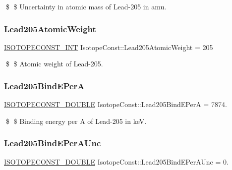 \$ \$ Uncertainty in atomic mass of Lead-\/205 in amu. \mbox{\label{group___isotope_const-_lead-_pb205_ga98f1d4f54ef198f49d8a35fec84fb336}} 
\subsubsection{\texorpdfstring{Lead205\+Atomic\+Weight}{Lead205AtomicWeight}}
{\footnotesize\ttfamily \mbox{\hyperlink{group___isotope_const-_macros_ga5f18360b3e99483a35c32d789e62621c}{I\+S\+O\+T\+O\+P\+E\+C\+O\+N\+S\+T\+\_\+\+I\+NT}} Isotope\+Const\+::\+Lead205\+Atomic\+Weight = 205}

\$ \$ Atomic weight of Lead-\/205. \mbox{\label{group___isotope_const-_lead-_pb205_ga2eb5e7edfab388ef4a3b675b405cca5b}} 
\subsubsection{\texorpdfstring{Lead205\+Bind\+E\+PerA}{Lead205BindEPerA}}
{\footnotesize\ttfamily \mbox{\hyperlink{group___isotope_const-_macros_ga8f45a7272ce02c0b4c65c44636ed719a}{I\+S\+O\+T\+O\+P\+E\+C\+O\+N\+S\+T\+\_\+\+D\+O\+U\+B\+LE}} Isotope\+Const\+::\+Lead205\+Bind\+E\+PerA = 7874.}

\$ \$ Binding energy per A of Lead-\/205 in keV. \mbox{\label{group___isotope_const-_lead-_pb205_ga0b8cdb74cdd2b3d8f9e1835adcd42325}} 
\subsubsection{\texorpdfstring{Lead205\+Bind\+E\+Per\+A\+Unc}{Lead205BindEPerAUnc}}
{\footnotesize\ttfamily \mbox{\hyperlink{group___isotope_const-_macros_ga8f45a7272ce02c0b4c65c44636ed719a}{I\+S\+O\+T\+O\+P\+E\+C\+O\+N\+S\+T\+\_\+\+D\+O\+U\+B\+LE}} Isotope\+Const\+::\+Lead205\+Bind\+E\+Per\+A\+Unc = 0.}

